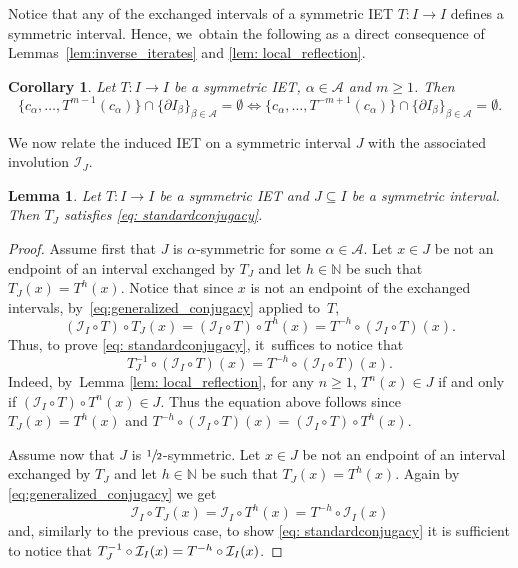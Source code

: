 \documentclass[10pt,a4paper]{amsart}
\theoremstyle{plain}
\newtheorem{lemma}[theorem]{Lemma}
\newtheorem{corollary}[theorem]{Corollary}
\theoremstyle{definition}
\newcommand{\A}{\mathcal{A}}
\newcommand{\I}{\mathcal{I}}
\newcommand{\N}{\mathbb{N}}
\begin{document}
Notice that any of the exchanged intervals of a symmetric IET $T: I \to I$ defines a symmetric interval. Hence, we~obtain the following as a direct consequence of Lem\-mas~\ref{lem:inverse_iterates} and \ref{lem: local_reflection}.

\begin{corollary}
Let $T : I \to I$ be a symmetric IET, $\alpha \in \A$ and $m \geq 1$. Then\vspace*{-3pt}
\[
\{c_\alpha, \ldots, T^{m - 1}(c_\alpha)\} \cap \{\partial I_\beta\}_{\beta \in \A} = \emptyset\iff \{c_\alpha, \ldots, T^{-m + 1}(c_\alpha)\} \cap \{\partial I_\beta\}_{\beta \in \A} = \emptyset.
\]
\end{corollary}

We now relate the induced IET on a symmetric interval $J$ with the associated involution $\I_J$.

\begin{lemma}
\label{lem:symmetric_condition}
Let $T : I \to I$ be a symmetric IET and $J \subseteq I$ be a symmetric interval. Then $T_J$ satisfies \eqref{eq: standardconjugacy}.\end{lemma}

\begin{proof}
Assume first that $J$ is $\alpha$-symmetric for some $\alpha\in\A$. Let $x\in J$ be not an endpoint of an interval exchanged by $T_J$ and let $h\in\N$ be such that $T_J(x)=T^{h}(x)$. Notice that since $x$ is not an endpoint of the exchanged intervals, by~\eqref{eq:generalized_conjugacy} applied to~$T$,\vspace*{-3pt}
\[
{(\I_I\circ T)\circ T_{J}(x)} = (\I_I\circ T) \circ T^h(x)=T^{-h}\circ (\I_I\circ T)(x).
\]
Thus, to prove \eqref{eq: standardconjugacy}, it~suffices to notice that\vspace*{-3pt}
\[
T_{J}^{-1}\circ (\I_I\circ T)(x) = T^{-h}\circ (\I_I\circ T)(x).
\]
Indeed, by~Lemma \ref{lem: local_reflection}, for any $n \geq 1$, $T^n(x) \in J$ if and only if $(\I_I\circ T) \circ T^n(x) \in J$. Thus the equation above follows since $T_J(x)=T^{h}(x)$ and $T^{-h}\circ (\I_I\circ T)(x) = (\I_I\circ T) \circ T^h(x)$.

Assume now that $J$ is $\sfrac{1}{2}$-symmetric. Let $x\in J$ be not an endpoint of an interval exchanged by $T_J$ and let $h\in\N$ be such that $T_J(x)=T^{h}(x)$. Again by \eqref{eq:generalized_conjugacy} we get\vspace*{-3pt}
\[
\I_I\circ T_{J}(x) = \I_I\circ T^h(x)=T^{-h}\circ \I_I(x)
\]
and, similarly to the previous case, to show \eqref{eq: standardconjugacy} it is sufficient to notice that $T_{J}^{-1}\circ\nobreak\I_I(x)=T^{-h}\circ\I_I(x)$.
\end{proof}
\end{document}
